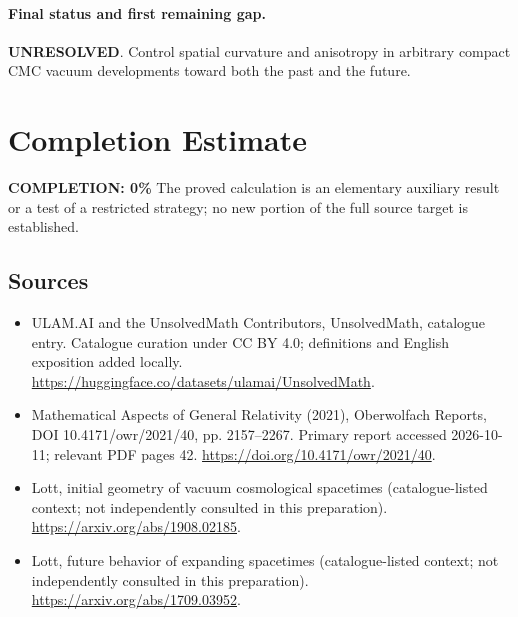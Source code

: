 \documentclass[11pt]{article}
\begin{document}
\paragraph{Final status and first remaining gap.}
\textbf{UNRESOLVED}. Control spatial curvature and anisotropy in arbitrary compact CMC vacuum developments toward both the past and the future.

\section{Completion Estimate}
\noindent\textbf{COMPLETION: 0\%}
The proved calculation is an elementary auxiliary result or a test of a restricted strategy; no new portion of the full source target is established.

\subsection{Sources}
\begin{itemize}
\item[\hypertarget{source:statement:1}{S1}] ULAM.AI and the UnsolvedMath Contributors, UnsolvedMath, catalogue entry. Catalogue curation under CC BY 4.0; definitions and English exposition added locally.
\url{https://huggingface.co/datasets/ulamai/UnsolvedMath}.
\item[\hypertarget{source:statement:2}{S2}] Mathematical Aspects of General Relativity (2021), Oberwolfach Reports, DOI 10.4171/owr/2021/40, pp. 2157--2267. Primary report accessed 2026-10-11; relevant PDF pages 42.
\url{https://doi.org/10.4171/owr/2021/40}.
\item[\hypertarget{source:statement:3}{S3}] Lott, initial geometry of vacuum cosmological spacetimes (catalogue-listed context; not independently consulted in this preparation).
\url{https://arxiv.org/abs/1908.02185}.
\item[\hypertarget{source:statement:4}{S4}] Lott, future behavior of expanding spacetimes (catalogue-listed context; not independently consulted in this preparation).
\url{https://arxiv.org/abs/1709.03952}.
\end{itemize}
\label{end:statement}
\end{document}
